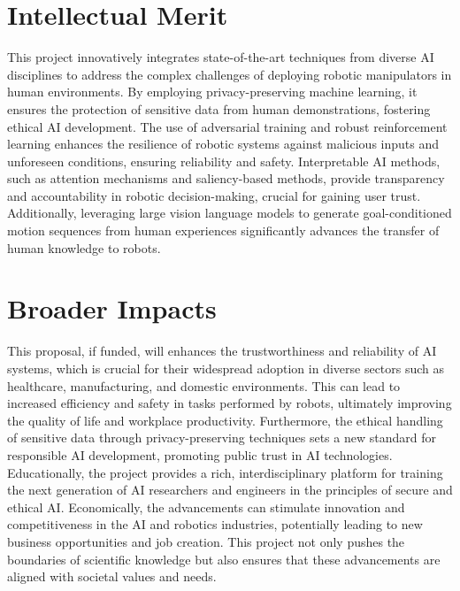 \documentclass[11pt]{NSF}
\begin{document}
\section{Intellectual Merit}
This project innovatively integrates state-of-the-art techniques from diverse AI disciplines to address the complex challenges of deploying robotic manipulators in human environments. 
By employing privacy-preserving machine learning, it ensures the protection of sensitive data from human demonstrations, fostering ethical AI development. 
The use of adversarial training and robust reinforcement learning enhances the resilience of robotic systems against malicious inputs and unforeseen conditions, ensuring reliability and safety. 
Interpretable AI methods, such as attention mechanisms and saliency-based methods, provide transparency and accountability in robotic decision-making, crucial for gaining user trust. 
Additionally, leveraging large vision language models to generate goal-conditioned motion sequences from human experiences significantly advances the transfer of human knowledge to robots. 



\section{Broader Impacts}
This proposal, if funded, will enhances the trustworthiness and reliability of AI systems, which is crucial for their widespread adoption in diverse sectors such as healthcare, manufacturing, and domestic environments. This can lead to increased efficiency and safety in tasks performed by robots, ultimately improving the quality of life and workplace productivity. 
Furthermore, the ethical handling of sensitive data through privacy-preserving techniques sets a new standard for responsible AI development, promoting public trust in AI technologies. 
Educationally, the project provides a rich, interdisciplinary platform for training the next generation of AI researchers and engineers in the principles of secure and ethical AI. 
Economically, the advancements can stimulate innovation and competitiveness in the AI and robotics industries, potentially leading to new business opportunities and job creation. 
This project not only pushes the boundaries of scientific knowledge but also ensures that these advancements are aligned with societal values and needs.
\end{document}
